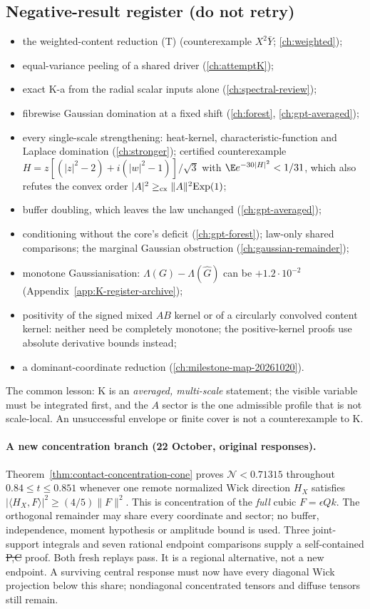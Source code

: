 \subsection{Negative-result register (do not retry)}
\begin{itemize}
\item the weighted-content reduction (T) (counterexample $X^2\bar Y$; \autoref{ch:weighted});
\item equal-variance peeling of a shared driver (\autoref{ch:attemptK});
\item exact K-a from the radial scalar inputs alone (\autoref{ch:spectral-review});
\item fibrewise Gaussian domination at a fixed shift (\autoref{ch:forest}, \autoref{ch:gpt-averaged});
\item every single-scale strengthening: heat-kernel, characteristic-function and Laplace domination (\autoref{ch:stronger}); certified counterexample
$H=z[(|z|^2-2)+i(|w|^2-1)]/\sqrt3$ with $\E e^{-30|H|^2}<1/31$, which also refutes the convex order $|A|^2\ge_{\rm cx}\|A\|^2\mathrm{Exp}(1)$;
\item buffer doubling, which leaves the law unchanged (\autoref{ch:gpt-averaged});
\item conditioning without the core's deficit (\autoref{ch:gpt-forest}); law-only shared comparisons; the marginal Gaussian obstruction (\autoref{ch:gaussian-remainder});
\item monotone Gaussianisation: $\Lambda(G)-\Lambda(\hat G)$ can be $+1.2\cdot10^{-2}$ (Appendix~\ref{app:K-register-archive});
\item positivity of the signed mixed $AB$ kernel or of a circularly convolved content kernel: neither need be completely monotone; the positive-kernel proofs use absolute
derivative bounds instead;
\item a dominant-coordinate reduction (\autoref{ch:milestone-map-20261020}).
\end{itemize}
The common lesson: K is an \emph{averaged, multi-scale} statement; the visible variable must be integrated first, and the $A$ sector is the one admissible profile that is
not scale-local. An unsuccessful envelope or finite cover is not a counterexample to K.

\paragraph{A new concentration branch (22 October, original responses).}
Theorem~\ref{thm:contact-concentration-cone} proves
$\mathcal N<0.71315$ throughout $0.84\le t\le0.851$ whenever one
remote normalized Wick direction $H_X$ satisfies
$|\langle H_X,F\rangle|^2\ge(4/5)\|F\|^2$.
This is concentration of the \emph{full} cubic $F=\epsilon Qk$.
The orthogonal remainder may share every coordinate and sector;
no buffer, independence, moment hypothesis or amplitude bound is used.
Three joint-support integrals and seven rational endpoint comparisons
supply a self-contained \st{P,C} proof. Both fresh replays pass.
It is a regional alternative, not a new endpoint. A surviving central
response must now have every diagonal Wick projection below this share;
nondiagonal concentrated tensors and diffuse tensors still remain.

